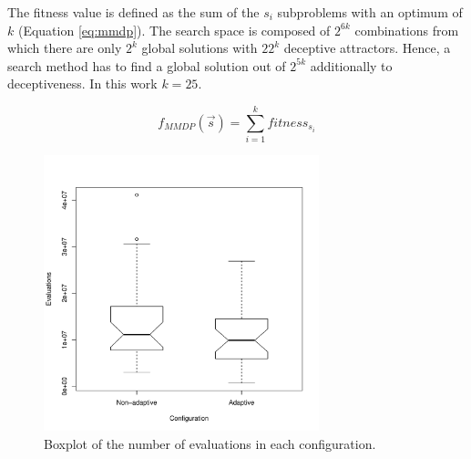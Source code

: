 The fitness value is defined as the sum of the $s_i$ subproblems with an optimum of $k$ (Equation \ref{eq:mmdp}).
The search space is composed of $2^{6k}$ combinations from which there
are only $2^k$ global solutions with $22^k$ deceptive
attractors. Hence, a search method has to find a global solution
out of $2^{5k}$ additionally to deceptiveness. In this work $k=25$. %

\begin{equation}\label{eq:mmdp}
f_{MMDP}(\vec s)= \sum_{i=1}^{k} fitness_{s_i}
\end{equation}


\begin{figure}
\centering
\includegraphics[width=8cm]{gfx/osgiliath/enabler.pdf}
\caption{Boxplot of the number of evaluations in each configuration.}
\label{fig:osgiliath:boxplot}
\end{figure}

\begin{table}
\caption{Results obtained using the Asynchronous Enabler.}
\label{tab:osgiliath:resultsenabler}
\end{table}



